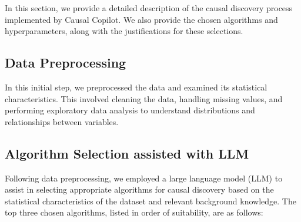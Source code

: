 \documentclass{article}
\begin{document}
In this section, we provide a detailed description of the causal discovery process implemented by Causal Copilot. 
We also provide the chosen algorithms and hyperparameters, along with the justifications for these selections.

\subsection{Data Preprocessing}
In this initial step, we preprocessed the data and examined its statistical characteristics. 
This involved cleaning the data, handling missing values, and performing exploratory data analysis to understand distributions and relationships between variables.
                
\subsection{Algorithm Selection assisted with LLM}
Following data preprocessing, we employed a large language model (LLM) to assist in selecting appropriate algorithms for causal discovery based on the statistical characteristics of the dataset and relevant background knowledge. The top three chosen algorithms, listed in order of suitability, are as follows:   
\end{document}
